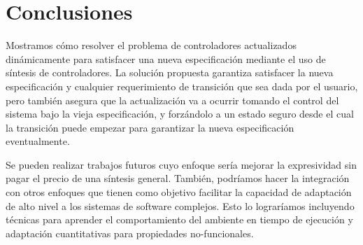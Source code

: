 \section{Conclusiones}

Mostramos cómo resolver el problema de controladores actualizados dinámicamente para satisfacer una nueva especificación
mediante el uso de síntesis de controladores. La solución propuesta garantiza satisfacer la nueva especificación y
cualquier requerimiento de transición que sea dada por el usuario, pero también asegura que la actualización va a
ocurrir tomando el control del sistema bajo la vieja especificación, y forzándolo a un estado seguro desde el cual la
transición puede empezar para garantizar la nueva especificación eventualmente.

Se pueden realizar trabajos futuros cuyo enfoque sería mejorar la expresividad sin pagar el precio de una síntesis
general. También, podríamos hacer la integración con otros enfoques que tienen como objetivo facilitar la capacidad de
adaptación de alto nivel a los sistemas de software complejos. Esto lo lograríamos incluyendo técnicas para aprender el
comportamiento del ambiente en tiempo de ejecución y adaptación cuantitativas para propiedades no-funcionales.

